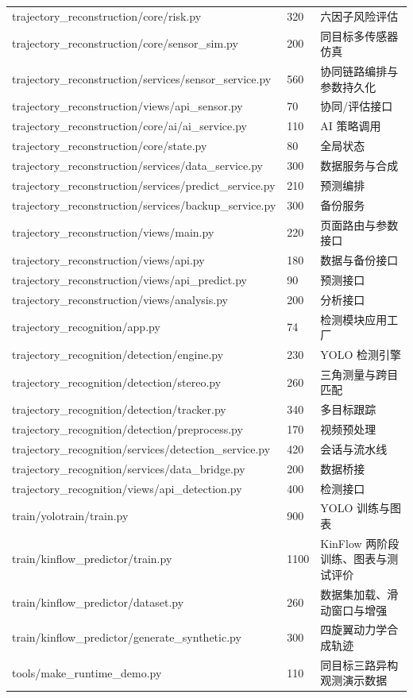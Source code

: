 \begin{longtable}{@{}>{\raggedright\ttfamily\scriptsize}p{8.0cm}>{\scriptsize}p{1.2cm}>{\raggedright\arraybackslash}p{4.3cm}@{}}
trajectory\_reconstruction/core/risk.py & 320 & 六因子风险评估 \\
trajectory\_reconstruction/core/sensor\_sim.py & 200 & 同目标多传感器仿真 \\
trajectory\_reconstruction/services/sensor\_service.py & 560 & 协同链路编排与参数持久化 \\
trajectory\_reconstruction/views/api\_sensor.py & 70 & 协同/评估接口 \\
trajectory\_reconstruction/core/ai/ai\_service.py & 110 & AI 策略调用 \\
trajectory\_reconstruction/core/state.py & 80 & 全局状态 \\
trajectory\_reconstruction/services/data\_service.py & 300 & 数据服务与合成 \\
trajectory\_reconstruction/services/predict\_service.py & 210 & 预测编排 \\
trajectory\_reconstruction/services/backup\_service.py & 300 & 备份服务 \\
trajectory\_reconstruction/views/main.py & 220 & 页面路由与参数接口 \\
trajectory\_reconstruction/views/api.py & 180 & 数据与备份接口 \\
trajectory\_reconstruction/views/api\_predict.py & 90 & 预测接口 \\
trajectory\_reconstruction/views/analysis.py & 200 & 分析接口 \\
trajectory\_recognition/app.py & 74 & 检测模块应用工厂 \\
trajectory\_recognition/detection/engine.py & 230 & YOLO 检测引擎 \\
trajectory\_recognition/detection/stereo.py & 260 & 三角测量与跨目匹配 \\
trajectory\_recognition/detection/tracker.py & 340 & 多目标跟踪 \\
trajectory\_recognition/detection/preprocess.py & 170 & 视频预处理 \\
trajectory\_recognition/services/detection\_service.py & 420 & 会话与流水线 \\
trajectory\_recognition/services/data\_bridge.py & 200 & 数据桥接 \\
trajectory\_recognition/views/api\_detection.py & 400 & 检测接口 \\
train/yolotrain/train.py & 900 & YOLO 训练与图表 \\
train/kinflow\_predictor/train.py & 1100 & KinFlow 两阶段训练、图表与测试评价 \\
train/kinflow\_predictor/dataset.py & 260 & 数据集加载、滑动窗口与增强 \\
train/kinflow\_predictor/generate\_synthetic.py & 300 & 四旋翼动力学合成轨迹 \\
tools/make\_runtime\_demo.py & 110 & 同目标三路异构观测演示数据 \\
\end{longtable}
